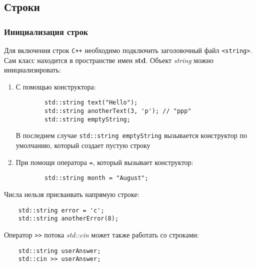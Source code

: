 \subsection{Строки}
\subsubsection{Инициализация строк}
Для включения строк \texttt{C++} необходимо подключить заголовочный файл \lstinline{<string>}. Сам класс находится в пространстве имен \textbf{std}. Объект \textit{string} можно инициализировать:

\begin{enumerate}
    \item С помощью конструктора:
    \begin{lstlisting}
        std::string text("Hello");
        std::string anotherText(3, 'p'); // "ppp"
        std::string emptyString;
    \end{lstlisting}

    В последнем случае \lstinline{std::string emptyString} вызывается конструктор по умолчанию, который создает пустую строку
    \item При помощи оператора \lstinline{=}, который вызывает конструктор:
    \begin{lstlisting}
        std::string month = "August";
    \end{lstlisting}
\end{enumerate}

Числа нельзя присваивать напрямую строке:
\begin{lstlisting}
    std::string error = 'c';
    std::string anotherError(8);
\end{lstlisting}

Оператор \lstinline{>>} потока \textit{std::cin} может также работать со строками:
\begin{lstlisting}
    std::string userAnswer;
    std::cin >> userAnswer;
\end{lstlisting}

